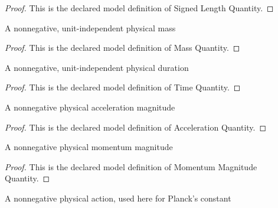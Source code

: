 \begin{proof}
  This is the declared model definition of Signed Length Quantity.
\end{proof}
\begin{definition}
  \label{def:physics:phyx-mini-0507:phyxminiproblems-problemphyxmini0507-massquantity}
  A nonnegative, unit-independent physical mass
\end{definition}
\begin{proof}
  This is the declared model definition of Mass Quantity.
\end{proof}
\begin{definition}
  \label{def:physics:phyx-mini-0507:phyxminiproblems-problemphyxmini0507-timequantity}
  A nonnegative, unit-independent physical duration
\end{definition}
\begin{proof}
  This is the declared model definition of Time Quantity.
\end{proof}
\begin{definition}
  \label{def:physics:phyx-mini-0507:phyxminiproblems-problemphyxmini0507-accelerationquantity}
  A nonnegative physical acceleration magnitude
\end{definition}
\begin{proof}
  This is the declared model definition of Acceleration Quantity.
\end{proof}
\begin{definition}
  \label{def:physics:phyx-mini-0507:phyxminiproblems-problemphyxmini0507-momentummagnitudequantity}
  A nonnegative physical momentum magnitude
\end{definition}
\begin{proof}
  This is the declared model definition of Momentum Magnitude Quantity.
\end{proof}
\begin{definition}
  \label{def:physics:phyx-mini-0507:phyxminiproblems-problemphyxmini0507-actionquantity}
  A nonnegative physical action, used here for Planck's constant
\end{definition}
